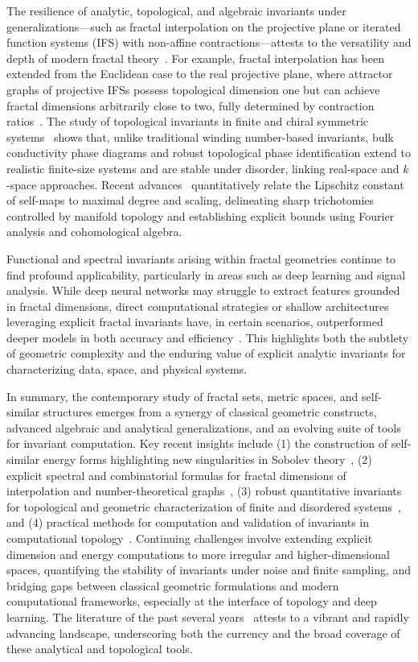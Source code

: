 \documentclass[sigconf]{acmart}
\begin{document}
The resilience of analytic, topological, and algebraic invariants under generalizations—such as fractal interpolation on the projective plane or iterated function systems (IFS) with non-affine contractions—attests to the versatility and depth of modern fractal theory~\cite{ref25,ref28,ref33,ref34}. For example, fractal interpolation has been extended from the Euclidean case to the real projective plane, where attractor graphs of projective IFSs possess topological dimension one but can achieve fractal dimensions arbitrarily close to two, fully determined by contraction ratios~\cite{ref33}. The study of topological invariants in finite and chiral symmetric systems~\cite{ref25} shows that, unlike traditional winding number-based invariants, bulk conductivity phase diagrams and robust topological phase identification extend to realistic finite-size systems and are stable under disorder, linking real-space and $k$-space approaches. Recent advances~\cite{ref34} quantitatively relate the Lipschitz constant of self-maps to maximal degree and scaling, delineating sharp trichotomies controlled by manifold topology and establishing explicit bounds using Fourier analysis and cohomological algebra.

Functional and spectral invariants arising within fractal geometries continue to find profound applicability, particularly in areas such as deep learning and signal analysis. While deep neural networks may struggle to extract features grounded in fractal dimensions, direct computational strategies or shallow architectures leveraging explicit fractal invariants have, in certain scenarios, outperformed deeper models in both accuracy and efficiency~\cite{ref92}. This highlights both the subtlety of geometric complexity and the enduring value of explicit analytic invariants for characterizing data, space, and physical systems.

In summary, the contemporary study of fractal sets, metric spaces, and self-similar structures emerges from a synergy of classical geometric constructs, advanced algebraic and analytical generalizations, and an evolving suite of tools for invariant computation. Key recent insights include (1) the construction of self-similar energy forms highlighting new singularities in Sobolev theory~\cite{ref13}, (2) explicit spectral and combinatorial formulas for fractal dimensions of interpolation and number-theoretical graphs~\cite{ref27,ref28,ref33}, (3) robust quantitative invariants for topological and geometric characterization of finite and disordered systems~\cite{ref25,ref34}, and (4) practical methods for computation and validation of invariants in computational topology~\cite{ref88}. Continuing challenges involve extending explicit dimension and energy computations to more irregular and higher-dimensional spaces, quantifying the stability of invariants under noise and finite sampling, and bridging gaps between classical geometric formulations and modern computational frameworks, especially at the interface of topology and deep learning. The literature of the past several years~\cite{ref13,ref21,ref25,ref27,ref28,ref33,ref34,ref43,ref88,ref92} attests to a vibrant and rapidly advancing landscape, underscoring both the currency and the broad coverage of these analytical and topological tools.
\end{document}
